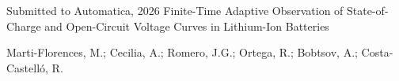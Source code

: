 \cventry
  {Submitted to Automatica, 2026}
  {Finite-Time Adaptive Observation of State-of-Charge and Open-Circuit Voltage Curves in Lithium-Ion Batteries}
  {}
  {}
  {
    \begin{cvitems}
      \item {Marti-Florences, M.; Cecilia, A.; Romero, J.G.; Ortega, R.; Bobtsov, A.; Costa-Castell\'o, R.}
    \end{cvitems}
  }
